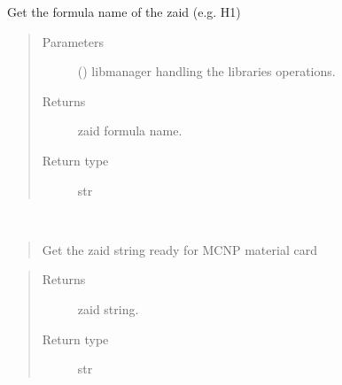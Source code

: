 \documentclass[letterpaper,10pt,english]{sphinxmanual}
\begin{document}
\begin{fulllineitems}
\begin{fulllineitems}
\label{\detokenize{api/inputgeneration:matreader.Zaid.get_fullname}}
\sphinxAtStartPar
Get the formula name of the zaid (e.g. H1)
\begin{quote}\begin{description}
\item[{Parameters}] \leavevmode
\sphinxAtStartPar
{} ({\hyperref[\detokenize{api/initobjects:libmanager.LibManager}]{}}) \textendash{} libmanager handling the libraries operations.

\item[{Returns}] \leavevmode
\sphinxAtStartPar
{} \textendash{} zaid formula name.

\item[{Return type}] \leavevmode
\sphinxAtStartPar
str

\end{description}\end{quote}

\end{fulllineitems}


\begin{fulllineitems}
\label{\detokenize{api/inputgeneration:matreader.Zaid.to_text}}~\begin{quote}

\sphinxAtStartPar
Get the zaid string ready for MCNP material card
\end{quote}
\begin{quote}\begin{description}
\item[{Returns}] \leavevmode
\sphinxAtStartPar
zaid string.

\item[{Return type}] \leavevmode
\sphinxAtStartPar
str

\end{description}\end{quote}

\end{fulllineitems}


\end{fulllineitems}
\end{document}
